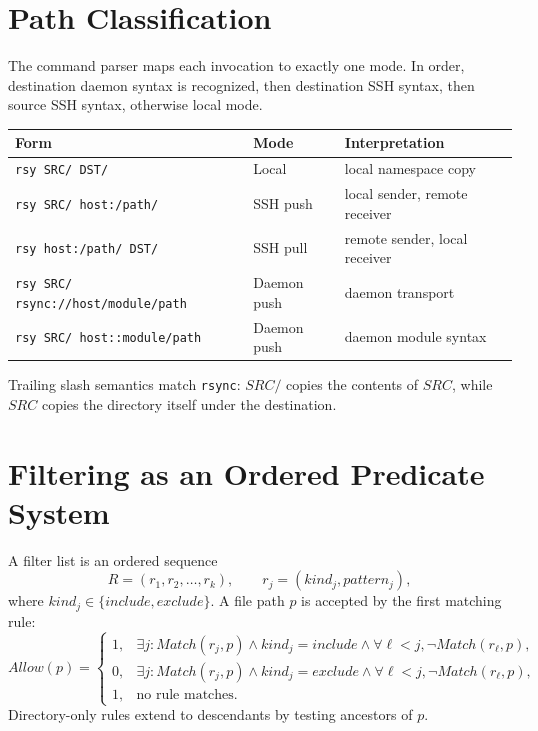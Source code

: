 \documentclass[11pt]{article}
\begin{document}
\section{Path Classification}

The command parser maps each invocation to exactly one mode. In order, destination daemon syntax is recognized, then destination SSH syntax, then source SSH syntax, otherwise local mode.

\begin{center}
\begin{tabular}{lll}
\toprule
Form & Mode & Interpretation \\
\midrule
\texttt{rsy SRC/ DST/} & Local & local namespace copy \\
\texttt{rsy SRC/ host:/path/} & SSH push & local sender, remote receiver \\
\texttt{rsy host:/path/ DST/} & SSH pull & remote sender, local receiver \\
\texttt{rsy SRC/ rsync://host/module/path} & Daemon push & daemon transport \\
\texttt{rsy SRC/ host::module/path} & Daemon push & daemon module syntax \\
\bottomrule
\end{tabular}
\end{center}

Trailing slash semantics match \texttt{rsync}: $SRC/$ copies the contents of $SRC$, while $SRC$ copies the directory itself under the destination.

\section{Filtering as an Ordered Predicate System}

A filter list is an ordered sequence
\[
  R = (r_1,r_2,\ldots,r_k), \qquad r_j = (kind_j, pattern_j),
\]
where $kind_j\in\{include,exclude\}$. A file path $p$ is accepted by the first matching rule:
\begin{equation}
  Allow(p) =
  \begin{cases}
    1, & \exists j: Match(r_j,p) \land kind_j=include \land \forall \ell<j,\neg Match(r_\ell,p), \\
    0, & \exists j: Match(r_j,p) \land kind_j=exclude \land \forall \ell<j,\neg Match(r_\ell,p), \\
    1, & \text{no rule matches.}
  \end{cases}
\end{equation}
Directory-only rules extend to descendants by testing ancestors of $p$.
\end{document}

